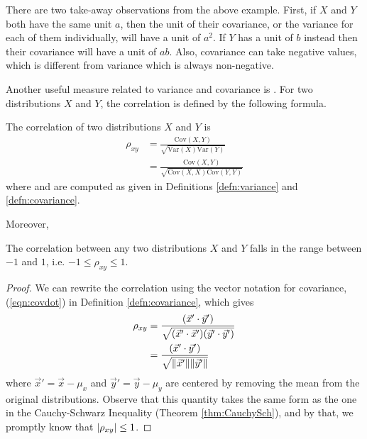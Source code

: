There are two take-away observations from the above example. First, if $X$ and $Y$ both have the same unit $a$, then the unit of their covariance, or the variance for each of them individually, will have a unit of $a^2$. If $Y$ has a unit of $b$ instead then their covariance will have a unit of $ab$. Also, covariance can take negative values, which is different from variance which is always non-negative.\par
Another useful measure related to variance and covariance is . For two distributions $X$ and $Y$, the correlation is defined by the following formula.
\begin{defn}[Correlation]
\label{defn:correlation}
The correlation of two distributions $X$ and $Y$ is
\begin{subequations}
\begin{align}
\rho_{xy} &= \frac{\text{Cov}(X,Y)}{\sqrt{\text{Var}(X) \text{Var}(Y)}} \\
&= \frac{\text{Cov}(X,Y)}{\sqrt{\text{Cov}(X,X) \text{Cov}(Y,Y)}}
\end{align}    
\end{subequations}
where  and  are computed as given in Definitions \ref{defn:variance} and \ref{defn:covariance}.
\end{defn}
Moreover,
\begin{proper}
The correlation between any two distributions $X$ and $Y$ falls in the range between $-1$ and $1$, i.e. $-1 \leq \rho_{xy} \leq 1$.
\end{proper}
\begin{proof}
We can rewrite the correlation using the vector notation for covariance, (\ref{eqn:covdot}) in Definition \ref{defn:covariance}, which gives
\begin{align*}
\rho_{xy} &= \frac{(\vec{x}' \cdot \vec{y}')}{\sqrt{(\vec{x}'\cdot\vec{x}')(\vec{y}'\cdot\vec{y}')}} \\
&= \frac{(\vec{x}' \cdot \vec{y}')}{\sqrt{{\norm{\vec{x}'}}\norm{\vec{y}'}}}
\end{align*}
where $\vec{x}' = \vec{x} - \mu_x$ and $\vec{y}' = \vec{y} - \mu_y$ are centered by removing the mean from the original distributions. Observe that this quantity takes the same form as the one in the Cauchy-Schwarz Inequality (Theorem \ref{thm:CauchySch}), and by that, we promptly know that $\abs{\rho_{xy}} \leq 1$.   
\end{proof}

